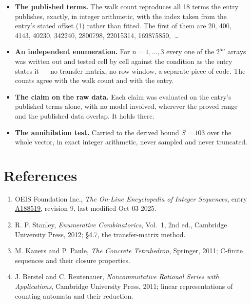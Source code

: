 \documentclass[11pt]{article}
\theoremstyle{definition}
\begin{document}
\begin{itemize}

\item {\bfseries The published terms.} The walk count reproduces all 18 terms the entry publishes, exactly, in integer arithmetic, with the index taken from the entry's stated offset (1) rather than fitted. The first of them are 20, 400, 4143, 40230, 342240, 2800798, 22015314, 169875850,~\dots

\item {\bfseries An independent enumeration.} For $n = 1,\dots,3$ every one of the $2^{5n}$ arrays was written out and tested cell by cell against the condition as the entry states it --- no transfer matrix, no row window, a separate piece of code. The counts agree with the walk count and with the entry.

\item {\bfseries The claim on the raw data.} Each claim was evaluated on the entry's published terms alone, with no model involved, wherever the proved range and the published data overlap. It holds there.

\item {\bfseries The annihilation test.} Carried to the derived bound $S = 103$ over the whole vector, in exact integer arithmetic, never sampled and never truncated.

\end{itemize}

\section{References}

\begin{enumerate}

\item OEIS Foundation Inc., \emph{The On-Line Encyclopedia of Integer Sequences}, entry \href{https://oeis.org/A188519}{A188519}, revision 9, last modified Oct 03 2025.

\item R. P. Stanley, \emph{Enumerative Combinatorics}, Vol.~1, 2nd ed., Cambridge University Press, 2012; \S4.7, the transfer-matrix method.

\item M. Kauers and P. Paule, \emph{The Concrete Tetrahedron}, Springer, 2011; C-finite sequences and their closure properties.

\item J. Berstel and C. Reutenauer, \emph{Noncommutative Rational Series with Applications}, Cambridge University Press, 2011; linear representations of counting automata and their reduction.

\end{enumerate}
\end{document}
